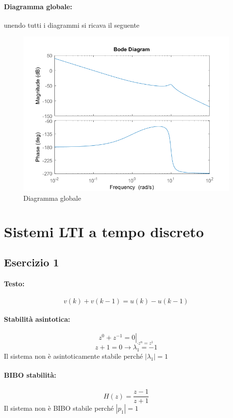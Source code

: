 \documentclass[a4paper,oneside,titlepage]{book}
\begin{document}
\paragraph{Diagramma globale:}
unendo tutti i diagrammi si ricava il seguente
\begin{figure}[htp]
	\centering
	\includegraphics[scale=0.5]{globale.png}
	\caption{Diagramma globale}
	\label{fig:globale}
\end{figure}


\newpage
\section{Sistemi LTI a tempo discreto}

\subsection{Esercizio 1}
\paragraph{Testo:}
\[ v(k) + v(k-1) = u(k) - u(k-1) \]

\paragraph{Stabilità asintotica:}
\[ \left. z^0 + z^{-1} = 0 \right|_{\cdot z^n = z^1} \]
\[ z + 1 = 0 \longrightarrow \lambda_1 = -1 \]
Il sistema non è asintoticamente stabile perché $|\lambda_1|=1$

\paragraph{BIBO stabilità:}
\[ H(z) = \frac{z-1}{z+1} \]
Il sistema non è BIBO stabile perché $|p_1|=1$
\end{document}

